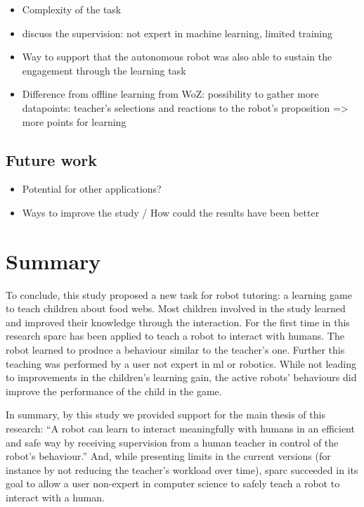 \begin{itemize}
	\item Complexity of the task
	\item discuss the supervision: not expert in machine learning, limited training
	\item Way to support that the autonomous robot was also able to sustain the engagement through the learning task
	\item Difference from offline learning from WoZ: possibility to gather more datapoints: teacher's selections and reactions to the robot's proposition => more points for learning
\end{itemize}

\subsection{Future work}



\begin{itemize}
	\item Potential for other applications?
	\item Ways to improve the study / How could the results have been better
\end{itemize}
\section{Summary}

To conclude, this study proposed a new task for robot tutoring: a learning game to teach children about food webs. Most children involved in the study learned and improved their knowledge through the interaction. For the first time in this research \gls{sparc} has been applied to teach a robot to interact with humans. The robot learned to produce a behaviour similar to the teacher's one. Further this teaching was performed by a user not expert in \gls{ml} or robotics. While not leading to improvements in the children's learning gain, the active robots' behaviours did improve the performance of the child in the game. 

In summary, by this study we provided support for the main thesis of this research: ``A robot can learn to interact meaningfully with humans in an efficient and safe way by receiving supervision from a human teacher in control of the robot's behaviour.'' And, while presenting limits in the current versions (for instance by not reducing the teacher's workload over time), \gls{sparc} succeeded in its goal to allow a user non-expert in computer science to safely teach a robot to interact with a human.